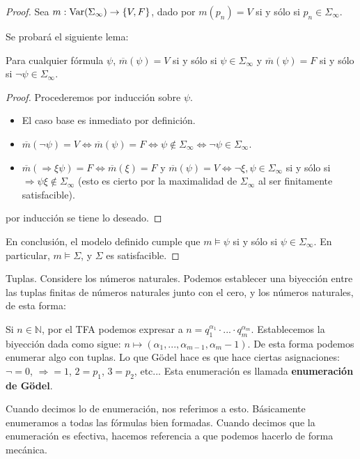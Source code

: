\documentclass[12pt]{report}
\theoremstyle{largebreak}
\newcommand\cf[3]{\ensuremath{#1:#2\rightarrow#3}}
\begin{document}
\begin{proof}
        Sea $\cf{m}{\textup{Var}(\Sigma_\infty)}{\left\{V,F\right\}}$, dado por $m(p_n)=V$ si y sólo si $p_n\in \Sigma_\infty$.

        Se probará el siguiente lema:

        \begin{lema}
            Para cualquier fórmula $\psi$, $\overline{m}(\psi)=V$ si y sólo si $\psi\in\Sigma_\infty$ y $\overline{m}(\psi)=F$ si y sólo si $\neg\psi\in\Sigma_\infty$.
        \end{lema}

        \begin{proof}
            Procederemos por inducción sobre $\psi$.
            \begin{itemize}
                \item El caso base es inmediato por definición.
                \item $\overline{m}(\neg\psi)=V\iff\overline{m}(\psi)=F\iff\psi\notin\Sigma_\infty\iff\neg\psi\in\Sigma_\infty$.
                \item $\overline{m}(\Rightarrow\xi\psi)=F\iff\overline{m}(\xi)=F$ y $\overline{m}(\psi)=V\iff\neg\xi,\psi\in\Sigma_\infty$ si y sólo si $\Rightarrow \psi\xi\notin\Sigma_\infty$ (esto es cierto por la maximalidad de $\Sigma_\infty$ al ser finitamente satisfacible).
            \end{itemize}
            por inducción se tiene lo deseado.
        \end{proof}

        En conclusión, el modelo definido cumple que $m\vDash\psi$ si y sólo si $\psi\in\Sigma_\infty$. En particular, $m\vDash\Sigma$, y $\Sigma$ es satisfacible.

    \end{proof}

    \begin{obs}
        Tuplas. Considere los números naturales. Podemos establecer una biyección entre las tuplas finitas de números naturales junto con el cero, y los números naturales, de esta forma:

        Si $n\in\mathbb{N}$, por el TFA podemos expresar a $n=q_1^{\alpha_1}\cdot...\cdot q_m^{\alpha_m}$. Establecemos la biyección dada como sigue: $n\mapsto(\alpha_1,...,\alpha_{m-1},\alpha_{m}-1)$. De esta forma podemos enumerar algo con tuplas. Lo que Gödel hace es que hace ciertas asignaciones: $\neg=0$, $\Rightarrow=1$, $2=p_1$, $3=p_2$, etc... Esta enumeración es llamada \textbf{enumeración de Gödel}.

        Cuando decimos lo de enumeración, nos referimos a esto. Básicamente enumeramos a todas las fórmulas bien formadas. Cuando decimos que la enumeración es efectiva, hacemos referencia a que podemos hacerlo de forma mecánica.
    \end{obs}
\end{document}
